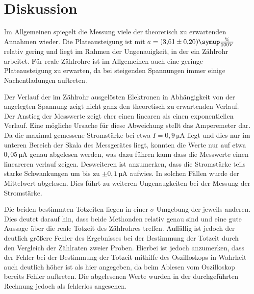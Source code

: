 \newpage
\section{Diskussion}
\label{sec:Diskussion}

Im Allgemeinen spiegelt die Messung viele der theoretisch zu erwartenden Annahmen
wieder. Die Plateausteigung ist mit $a=(3{,}61 \pm 0{,}20) \symup{\frac{\%}{100V}}$
relativ gering und liegt im Rahmen der Ungenauigkeit, in der ein Zählrohr arbeitet.
Für reale Zählrohre ist im Allgemeinen auch eine geringe Plateausteigung zu erwarten,
da bei steigenden Spannungen immer einige Nachentladungen auftreten.

Der Verlauf der im Zählrohr ausgelösten Elektronen in Abhängigkeit von der angelegten
Spannung zeigt nicht ganz den theoretisch zu erwartenden Verlauf. Der Anstieg
der Messwerte zeigt eher einen linearen als einen exponentiellen Verlauf. Eine
mögliche Ursache für diese Abweichung stellt das Amperemeter dar. Da die maximal
gemessene Stromstärke bei etwa $I=0{,}9\,$µA liegt und dies nur im unteren Bereich
der Skala des Messgerätes liegt, konnten die Werte nur auf etwa $0{,}05\,$µA genau
abgelesen werden, was dazu führen kann dass die Messwerte einen lineareren verlauf
zeigen. Desweiteren ist anzumerken, dass die Stromstärke teils starke Schwankungen
um bis zu $\pm 0{,}1\,$µA aufwies. In solchen Fällen wurde der Mittelwert abgelesen.
Dies führt zu weiteren Ungenaugkeiten bei der Messung der Stromstärke.

Die beiden bestimmten Totzeiten liegen in einer $\sigma$ Umgebung der jeweils
anderen. Dies deutet darauf hin, dass beide Methonden relativ genau sind und
eine gute Aussage über die reale Totzeit des Zählrohres treffen. Auffällig
ist jedoch der deutlich größere Fehler des Ergebnisses bei der Bestimmung der Totzeit
durch den Vergleich der Zählraten zweier Proben. Hierbei ist jedoch anzumerken,
dass der Fehler bei der Bestimmung der Totzeit mithilfe des Oszilloskops in Wahrheit
auch deutlich höher ist als hier angegeben, da beim Ablesen vom Oszilloskop bereits
Fehler auftreten. Die abgelesenen Werte wurden in der durchgeführten Rechnung jedoch als
fehlerlos angesehen.
